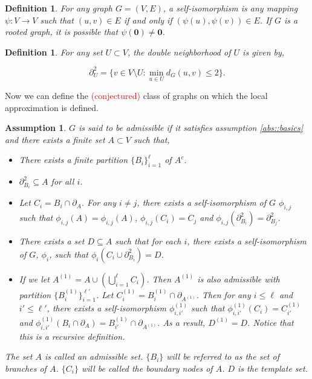 \documentclass[12pt]{article}
\newcommand{\ra}{\rightarrow}
\newcommand{\tr}{\textcolor{red}}
\newcommand{\neigh}[1]{\partial_{#1}}				%
\renewcommand{\root}{\mathbf{0}}
\newcommand{\dneigh}[1]{\partial^2_{#1}}
\newtheorem{defn}[thms]{Definition}
\newtheorem{assu}[thms]{Assumption}
\begin{document}
\begin{defn}
For any graph \(G = (V,E)\), a self-isomorphism is any mapping \(\psi: V \ra V\) such that \((u,v) \in E\) if and only if \((\psi(u),\psi(v)) \in E\). If \(G\) is a rooted graph, it is possible that \(\psi(\root) \neq \root\).
\label{abs::selfiso}
\end{defn}

\begin{defn}
For any set \(U \subset V\), the double neighborhood of \(U\) is given by,

\[\dneigh{U} = \{v \in V\setminus U: \min_{u\in U} d_G(u,v) \leq 2\}.\]
\label{abs::dneigh}
\end{defn}

Now we can define the \tr{(conjectured)} class of graphs on which the local approximation is defined.

\begin{assu}
\(G\) is said to be admissible if it satisfies assumption \ref{abs::basics} and there exists a finite set \(A \subset V\) such that,

\begin{itemize}
\item There exists a finite partition \(\{B_i\}_{i=1}^\ell\) of \(A^c\).

\item \(\dneigh{B_i} \subseteq A\) for all \(i\).

\item Let \(C_i = B_i\cap \neigh{A}\). For any \(i \neq j\), there exists a self-isomorphism of \(G\) \(\phi_{i,j}\) such that \(\phi_{i,j}(A) = \phi_{i,j}(A)\), \(\phi_{i,j}(C_i) = C_j\) and \(\phi_{i,j}(\dneigh{B_i}) = \dneigh{B_j}\).

\item There exists a set \(D \subseteq A\) such that for each \(i\), there exists a self-isomorphism of \(G\), \(\phi_i\), such that \(\phi_i(C_i\cup \dneigh{B_i}) = D\).

\item If we let \(A^{(1)} = A\cup \left(\bigcup_{i=1}^\ell C_i\right)\). Then \(A^{(1)}\) is also admissible with partition \(\{B^{(1)}_i\}_{i=1}^{\ell'}\). Let \(C^{(1)}_i = B^{(1)}_i\cap \neigh{A^{(1)}}\). Then for any \(i \leq \ell\) and \(i' \leq \ell'\), there exists a self-isomorphism \(\phi^{(1)}_{i,i'}\) such that \(\phi^{(1)}_{i,i'}(C_i) = C^{(1)}_{i'}\) and \(\phi^{(1)}_{i,i'}(B_i\cap\neigh{A}) = B^{(1)}_{i'}\cap \neigh{A^{(1)}}\). As a result, \(D^{(1)} = D\). Notice that this is a recursive definition.
\end{itemize}

The set \(A\) is called an admissible set. \(\{B_i\}\) will be referred to as the set of branches of \(A\). \(\{C_i\}\) will be called the boundary nodes of \(A\). \(D\) is the template set.
\label{abs::admissible}
\end{assu}
\end{document}
